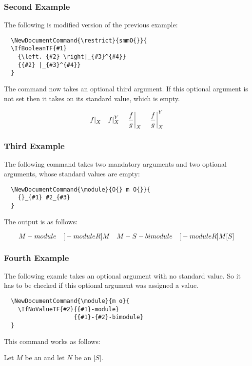 \documentclass[a4paper, 10pt, abstract=on, headings=standardclasses]{scrartcl}
\begin{document}
\subsubsection{Second Example}

The following is modified version of the previous example:
\begin{lstlisting}
  \NewDocumentCommand{\restrict}{smmO{}}{
  \IfBooleanTF{#1}
    {\left. {#2} \right|_{#3}^{#4}}
    {{#2} |_{#3}^{#4}}
  }
\end{lstlisting}
The command now takes an optional third argument.
If this optional argument is not set then it takes on its standard value, which is empty.
\begin{LTXexample}[pos = r]
  \[
    \restrict{f}{X}
    \quad
    \restrict{f}{X}[Y]
    \quad
    \restrict*{\frac{f}{g}}{X}
    \quad
    \restrict*{\frac{f}{g}}{X}[Y]
  \]
\end{LTXexample}

\subsubsection{Third Example}

The following command takes two mandatory arguments and two optional arguments, whose standard values are empty:
\begin{lstlisting}
  \NewDocumentCommand{\module}{O{} m O{}}{
    {}_{#1} #2_{#3}
  }
\end{lstlisting}
The output is as follows:
\begin{LTXexample}[pos = r]
  \[
    \module{M}
    \quad
    \module[R]{M}
    \quad
    \module{M}[S]
    \quad
    \module[R]{M}[S]
  \]
\end{LTXexample}

\subsubsection{Fourth Example}

The following examle takes an optional argument with no standard value.
So it has to be checked if this optional argument was assigned a value.
\begin{lstlisting}
  \NewDocumentCommand{\module}{m o}{
    \IfNoValueTF{#2}{{#1}-module}
                    {{#1}-{#2}-bimodule}
  }
\end{lstlisting}
This command works as follows:
\begin{LTXexample}[pos = b]
  Let $M$ be an  and let $N$ be an [$S$].
\end{LTXexample}
\end{document}
